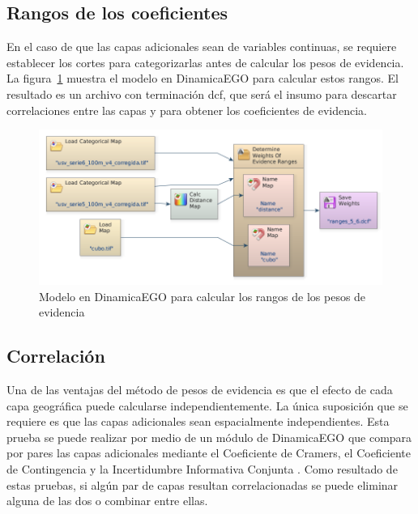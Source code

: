 \documentclass[12pt,a4paper,oldfontcommands]{article}
\begin{document}
\subsection{Rangos de los coeficientes}

 En el caso de que las capas adicionales sean de variables continuas, se requiere establecer los cortes para categorizarlas antes de calcular los pesos de evidencia. La figura~\ref{fig:ranges} muestra el modelo en DinamicaEGO para calcular estos rangos. El resultado es un archivo con terminación dcf, que será el insumo para descartar correlaciones entre las capas y para obtener los coeficientes de evidencia.
 
\bigskip
\begin{figure}[H]
	\centering
	\includegraphics[width=1\textwidth]{./figuras/ranges.png}
	\caption{Modelo en DinamicaEGO para calcular los rangos de los pesos de evidencia}
	\label{fig:ranges}
\end{figure}
\subsection{Correlación}
Una de las ventajas del método de pesos de evidencia es que el efecto de cada capa geográfica puede calcularse independientemente. La única suposición que se requiere es que las capas adicionales sean espacialmente independientes. Esta prueba se puede realizar por medio de un módulo de DinamicaEGO que compara por pares las capas adicionales mediante el Coeficiente de Cramers, el Coeficiente de Contingencia y la Incertidumbre Informativa Conjunta \cite{cap8_1994}. Como resultado de estas pruebas, si algún par de capas resultan correlacionadas se puede eliminar alguna de las dos o combinar entre ellas.
 
\end{document}
